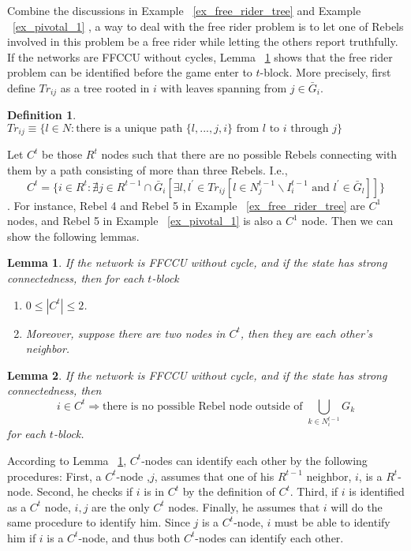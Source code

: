 \documentclass[12pt,letterpaper]{article}
\newtheorem{lemma}{Lemma}[section]
\newtheorem{definition}{Definition}[section]
\theoremstyle{definition}
\theoremstyle{remark}
\theoremstyle{claim}
\begin{document}
Combine the discussions in Example ~\ref{ex_free_rider_tree} and Example ~\ref{ex_pivotal_1} , a way to deal with the free rider problem is to let one of Rebels involved in this problem be a free rider while letting the others report truthfully. If the networks are FFCCU without cycles, Lemma ~\ref{lemma_at_most_two_nodes} shows that the free rider problem can be identified before the game enter to $t$-block. More precisely, first define $Tr_{ij}$ as a tree rooted in $i$ with leaves spanning from $j\in \bar{G}_i$.

\begin{definition}
$Tr_{ij}\equiv \{l\in N:\text{there is a unique path $\{l,...,j,i\}$ from $l$ to $i$ through $j$}\}$
\end{definition}

Let $C^t$ be those $R^t$ nodes such that there are no possible Rebels connecting with them by a path consisting of more than three Rebels. I.e., 
\[C^t=\{i\in R^t:\nexists j\in R^{t-1}\cap \bar{G}_i[\exists l,l^{'}\in Tr_{ij}[l\in N^{t-1}_j\backslash I^{t-1}_i \text{ and } l^{'}\in \bar{G}_l]]\}\]
.  For instance, Rebel 4 and Rebel 5 in Example ~\ref{ex_free_rider_tree} are $C^1$ nodes, and Rebel 5 in Example ~\ref{ex_pivotal_1} is also a $C^1$ node. Then we can show the following lemmas. 

\begin{lemma}
\label{lemma_at_most_two_nodes}
If the network is FFCCU without cycle, and  if the state has strong connectedness, then for each $t$-block
\begin{enumerate}
\item $0\leq |C^t| \leq 2$.
\item Moreover, suppose there are two nodes in $C^t$, then they are each other's neighbor.
\end{enumerate}
\end{lemma}


\begin{lemma}
\label{lemma_no_node_outside}
If the network is FFCCU without cycle, and if the state has strong connectedness, then 
\[i\in C^t \Rightarrow \text{there is no possible Rebel node outside of }\bigcup_{k\in N^{t-1}_i}G_k\]
for each $t$-block.
\end{lemma}

According to Lemma ~\ref{lemma_at_most_two_nodes}, $C^t$-nodes can identify each other by the following procedures: First, a $C^t$-node ,$j$, assumes that one of his $R^{t-1}$ neighbor, $i$, is a $R^t$-node. Second, he checks if $i$ is in $C^t$ by the definition of $C^t$. Third, if $i$ is identified as a $C^t$ node, $i,j$ are the only $C^t$ nodes. Finally, he assumes that $i$ will do the same procedure to identify him. Since $j$ is a $C^t$-node, $i$ must be able to identify him if $i$ is a $C^t$-node, and thus both $C^t$-nodes can identify each other.
\end{document}
